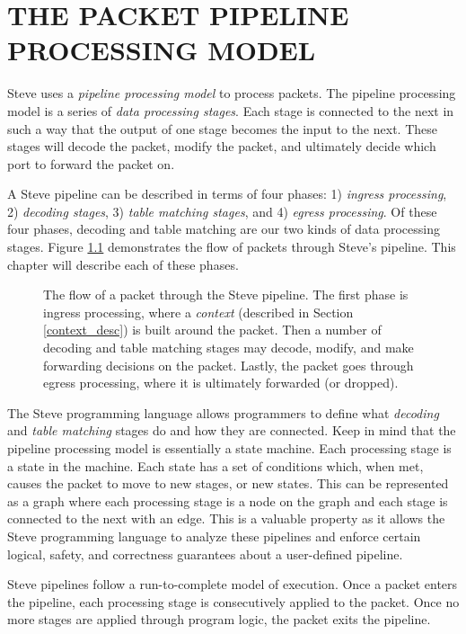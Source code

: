 \chapter{THE PACKET PIPELINE PROCESSING MODEL} \label{ch:pipeline_model}

Steve uses a \textit{pipeline processing model} to process packets. The pipeline processing model is a series of \textit{data processing stages}. Each stage is connected to the next in such a way that the output of one stage becomes the input to the next. These stages will decode the packet, modify the packet, and ultimately decide which port to forward the packet on.

A Steve pipeline can be described in terms of four phases: 1) \textit{ingress processing}, 2) \textit{decoding stages}, 3) \textit{table matching stages}, and 4) \textit{egress processing}. Of these four phases, decoding and table matching are our two kinds of data processing stages. Figure \ref{fg:pipeline_model} demonstrates the flow of packets through Steve's pipeline. This chapter will describe each of these phases.

\begin{figure}
\caption{The flow of a packet through the Steve pipeline. The first phase is ingress processing, where a \textit{context} (described in Section \ref{context_desc}) is built around the packet. Then a number of decoding and table matching stages may decode, modify, and make forwarding decisions on the packet. Lastly, the packet goes through egress processing, where it is ultimately forwarded (or dropped).}
\label{fg:pipeline_model}
\end{figure}

The Steve programming language allows programmers to define what \textit{decoding} and \textit{table matching} stages do and how they are connected. Keep in mind that the pipeline processing model is essentially a state machine. Each processing stage is a state in the machine. Each state has a set of conditions which, when met, causes the packet to move to new stages, or new states. This can be represented as a graph where each processing stage is a node on the graph and each stage is connected to the next with an edge. This is a valuable property as it allows the Steve programming language to analyze these pipelines and enforce certain logical, safety, and correctness guarantees about a user-defined pipeline.

Steve pipelines follow a run-to-complete model of execution. Once a packet enters the pipeline, each processing stage is consecutively applied to the packet. Once no more stages are applied through program logic, the packet exits the pipeline.

